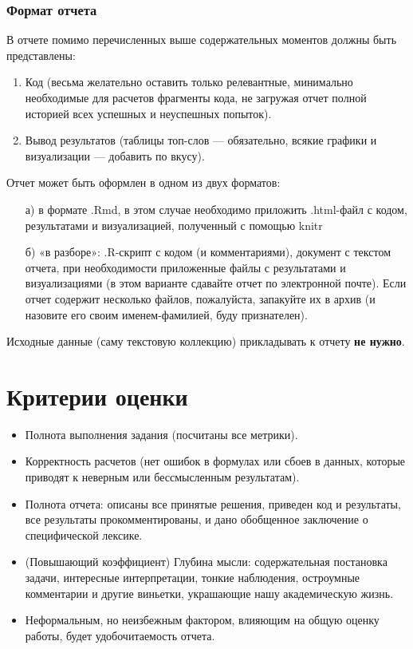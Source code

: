 \documentclass{report}
\begin{document}
\subsubsection{Формат отчета}

В отчете помимо перечисленных выше содержательных моментов должны быть
представлены:

\begin{enumerate}
\item Код (весьма желательно оставить только релевантные, минимально
  необходимые для расчетов фрагменты кода, не загружая отчет полной
  историей всех успешных и неуспешных попыток).
\item Вывод результатов (таблицы топ-слов — обязательно, всякие
  графики и визуализации — добавить по вкусу).
\end{enumerate}

Отчет может быть оформлен в одном из двух форматов:
\begin{itemize}
\item[а)] в формате .Rmd, в этом случае необходимо приложить
  .html-файл с кодом, результатами и визуализацией, полученный с
  помощью knitr
\item[б)] «в разборе»: .R-скрипт с кодом (и комментариями), документ с
  текстом отчета, при необходимости приложенные файлы с результатами и
  визуализациями (в этом варианте сдавайте отчет по электронной
  почте). Если отчет содержит несколько файлов, пожалуйста, запакуйте их в архив
(и назовите его своим именем-фамилией, буду признателен).
\end{itemize}

Исходные данные (саму текстовую коллекцию) прикладывать к отчету \textbf{не нужно}.

\section{Критерии оценки}

\begin{itemize}
\item Полнота выполнения задания (посчитаны все метрики). 
\item Корректность расчетов (нет ошибок в формулах или сбоев в данных,
  которые приводят к неверным или бессмысленным результатам).
\item Полнота отчета: описаны все принятые решения, приведен код и
  результаты, все результаты прокомментированы, и дано обобщенное
  заключение о специфической лексике.
\item (Повышающий коэффициент) Глубина мысли: содержательная
  постановка задачи, интересные интерпретации, тонкие наблюдения,
  остроумные комментарии и другие виньетки, украшающие нашу
  академическую жизнь.
\item Неформальным, но неизбежным фактором, влияющим на общую оценку
  работы, будет удобочитаемость отчета.
\end{itemize}
\end{document}
